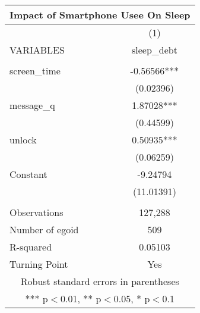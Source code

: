 \documentclass[]{article}
\begin{document}
\begin{tabular}{lc}
\multicolumn{2}{c}{Impact of Smartphone Usee On Sleep} \\ \hline
 & (1) \\
VARIABLES & sleep\_debt \\ \hline
 &  \\
screen\_time & -0.56566*** \\
 & (0.02396) \\
message\_q & 1.87028*** \\
 & (0.44599) \\
unlock & 0.50935*** \\
 & (0.06259) \\
Constant & -9.24794 \\
 & (11.01391) \\
 &  \\
Observations & 127,288 \\
Number of egoid & 509 \\
R-squared & 0.05103 \\
 Turning Point & Yes \\ \hline
\multicolumn{2}{c}{ Robust standard errors in parentheses} \\
\multicolumn{2}{c}{ *** p$<$0.01, ** p$<$0.05, * p$<$0.1} \\
\end{tabular}
\end{document}
